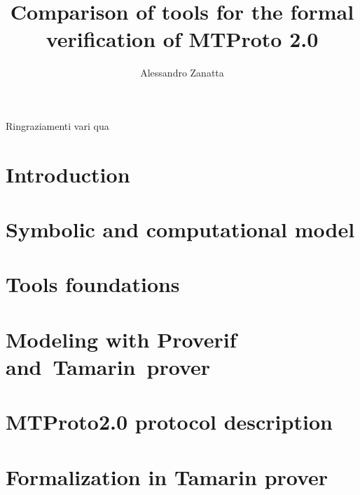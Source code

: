 \documentclass[target=bach,aauheader=]{thud}
\title{Comparison of tools for the formal verification of MTProto 2.0}
\author{Alessandro Zanatta}
\begin{document}
\maketitle


\acknowledgements
Ringraziamenti vari qua


\tableofcontents



\mainmatter

\chapter{Introduction}


\chapter{Symbolic and computational model}


\chapter{Tools foundations}


\chapter{Modeling with Proverif and~Tamarin~prover}


\chapter{MTProto2.0 protocol description}


\chapter{Formalization in Tamarin prover}

\end{document}
